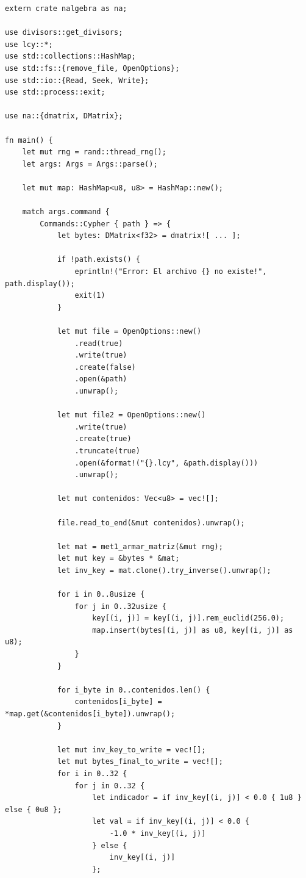 \documentclass[a4paper]{article}
\begin{document}
\begin{verbatim}
extern crate nalgebra as na;

use divisors::get_divisors;
use lcy::*;
use std::collections::HashMap;
use std::fs::{remove_file, OpenOptions};
use std::io::{Read, Seek, Write};
use std::process::exit;

use na::{dmatrix, DMatrix};

fn main() {
    let mut rng = rand::thread_rng();
    let args: Args = Args::parse();

    let mut map: HashMap<u8, u8> = HashMap::new();

    match args.command {
        Commands::Cypher { path } => {
            let bytes: DMatrix<f32> = dmatrix![ ... ];

            if !path.exists() {
                eprintln!("Error: El archivo {} no existe!", path.display());
                exit(1)
            }

            let mut file = OpenOptions::new()
                .read(true)
                .write(true)
                .create(false)
                .open(&path)
                .unwrap();

            let mut file2 = OpenOptions::new()
                .write(true)
                .create(true)
                .truncate(true)
                .open(&format!("{}.lcy", &path.display()))
                .unwrap();

            let mut contenidos: Vec<u8> = vec![];

            file.read_to_end(&mut contenidos).unwrap();

            let mat = met1_armar_matriz(&mut rng);
            let mut key = &bytes * &mat;
            let inv_key = mat.clone().try_inverse().unwrap();

            for i in 0..8usize {
                for j in 0..32usize {
                    key[(i, j)] = key[(i, j)].rem_euclid(256.0);
                    map.insert(bytes[(i, j)] as u8, key[(i, j)] as u8);
                }
            }

            for i_byte in 0..contenidos.len() {
                contenidos[i_byte] = *map.get(&contenidos[i_byte]).unwrap();
            }

            let mut inv_key_to_write = vec![];
            let mut bytes_final_to_write = vec![];
            for i in 0..32 {
                for j in 0..32 {
                    let indicador = if inv_key[(i, j)] < 0.0 { 1u8 } else { 0u8 };
                    let val = if inv_key[(i, j)] < 0.0 {
                        -1.0 * inv_key[(i, j)]
                    } else {
                        inv_key[(i, j)]
                    };


\end{verbatim}
\end{document}
